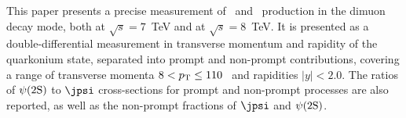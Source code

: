 This paper presents a precise measurement of
\jpsi\ and  \psiprime\ production in the dimuon decay mode, both at $\sqrt{s} = 7$~TeV
and at $\sqrt{s} = 8$~TeV.
It is presented as a double-differential measurement in transverse momentum and rapidity of the quarkonium state, 
separated into prompt and non-prompt contributions,
covering a range of transverse momenta $8 < \mbox{$p_{\text{T}}$}\leq 110$ \GeV\ and rapidities $|y|<2.0$. 
The ratios of $\psi(2\mathrm{S})$ to $\jpsi$  cross-sections for prompt and non-prompt processes are also reported, as well as the 
non-prompt fractions of $\jpsi$ and $\psi(2\mathrm{S})$.